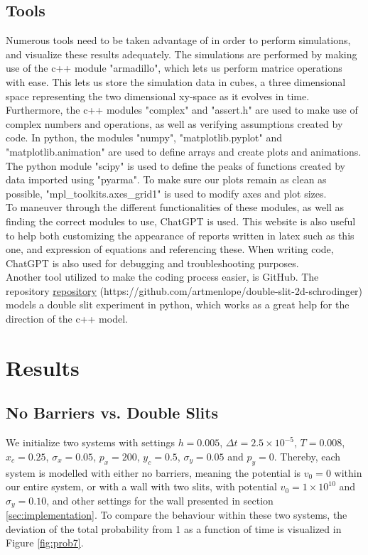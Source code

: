 \documentclass[10pt, nofootinbib, twocolumn]{revtex4-1}
\begin{document}
\subsection{Tools}
Numerous tools need to be taken advantage of in order to perform simulations, and visualize these results adequately. 
The simulations are performed by making use of the c++ module "armadillo", which lets us perform matrice operations with ease. This lets us store the simulation data in cubes, a three dimensional space representing the two dimensional xy-space as it evolves in time. Furthermore, the c++ modules "complex" and "assert.h" are used to make use of complex numbers and operations, as well as verifying assumptions created by code. In python, the modules "numpy", "matplotlib.pyplot" and "matplotlib.animation" are used to define arrays and create plots and animations. The python module "scipy" is used to define the peaks of functions created by data imported using "pyarma". To make sure our plots remain as clean as possible, "mpl\_toolkits.axes\_grid1" is used to modify axes and plot sizes.\\

To maneuver through the different functionalities of these modules, as well as finding the correct modules to use, ChatGPT is used. This website is also useful to help both customizing the appearance of reports written in latex such as this one, and expression of equations and referencing these. When writing code, ChatGPT is also used for debugging and troubleshooting purposes. \\

Another tool utilized to make the coding process easier, is GitHub. The repository
\href{https://github.com/artmenlope/double-slit-2d-schrodinger}{repository} (https://github.com/artmenlope/double-slit-2d-schrodinger) models a double slit experiment in python, which works as a great help for the direction of the c++ model.


\cleardoublepage
\section{Results}\label{sec:results}
\subsection{No Barriers vs. Double Slits}
We initialize two systems with settings $h = 0.005$, $\Delta t = 2.5\times10^{-5}$, $T = 0.008$, $x_c = 0.25$, $\sigma_x = 0.05$, $p_x = 200$, $y_c = 0.5$, $\sigma_y = 0.05$ and $p_y = 0$. Thereby, each system is modelled with either no barriers, meaning the potential is $v_0=0$ within our entire system, or with a wall with two slits, with potential $v_0 = 1\times10^{10}$ and $\sigma_y = 0.10$, and other settings for the wall presented in section \ref{sec:implementation}. To compare the behaviour within these two systems, the deviation of the total probability from 1 as a function of time is visualized in Figure \ref{fig:prob7}.
\end{document}
